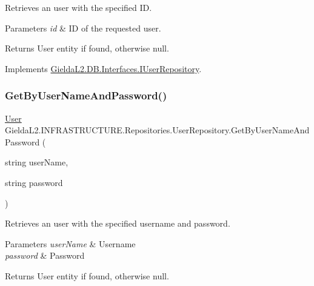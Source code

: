 Retrieves an user with the specified ID. 


\begin{DoxyParams}{Parameters}
{\em id} & ID of the requested user.\\
\hline
\end{DoxyParams}
\begin{DoxyReturn}{Returns}
User entity if found, otherwise null.
\end{DoxyReturn}


Implements \mbox{\hyperlink{interface_gielda_l2_1_1_d_b_1_1_interfaces_1_1_i_user_repository_ae3b2e6d986054c6b336887b4d0d1cfac}{Gielda\+L2.\+D\+B.\+Interfaces.\+I\+User\+Repository}}.

\mbox{\label{class_gielda_l2_1_1_i_n_f_r_a_s_t_r_u_c_t_u_r_e_1_1_repositories_1_1_user_repository_a6ddb02c156ab0944804a41a5a9531482}} 
\subsubsection{\texorpdfstring{GetByUserNameAndPassword()}{GetByUserNameAndPassword()}}
{\footnotesize\ttfamily \mbox{\hyperlink{class_gielda_l2_1_1_d_b_1_1_entities_1_1_user}{User}} Gielda\+L2.\+I\+N\+F\+R\+A\+S\+T\+R\+U\+C\+T\+U\+R\+E.\+Repositories.\+User\+Repository.\+Get\+By\+User\+Name\+And\+Password (\begin{DoxyParamCaption}\item[{string}]{user\+Name,  }\item[{string}]{password }\end{DoxyParamCaption})}



Retrieves an user with the specified username and password. 


\begin{DoxyParams}{Parameters}
{\em user\+Name} & Username\\
\hline
{\em password} & Password\\
\hline
\end{DoxyParams}
\begin{DoxyReturn}{Returns}
User entity if found, otherwise null.
\end{DoxyReturn}


